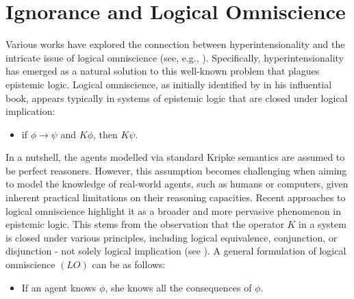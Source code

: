 \documentclass{article}
\begin{document}
\section{Ignorance and Logical Omniscience}
\label{SecOmniscience}

Various works have explored the connection between hyperintensionality and the intricate issue of logical omniscience (see, e.g., \citet{Fagin1995}). Specifically, hyperintensionality has emerged as a natural solution to this well-known problem that plagues epistemic logic. Logical omniscience, as initially identified by \citet{Hintikka1962} in his influential book, appears typically in systems of epistemic logic that are closed under logical implication:

\begin{itemize}

\item[$(LI)$] if $\phi \rightarrow \psi$ and $K \phi$, then $K \psi$.

\end{itemize}

In a nutshell, the agents modelled via standard Kripke semantics are assumed to be perfect reasoners. However, this assumption becomes challenging when aiming to model the knowledge of real-world agents, such as humans or computers, given inherent practical limitations on their reasoning capacities. Recent approaches to logical omniscience highlight it as a broader and more pervasive phenomenon in epistemic logic. This stems from the observation that the operator $K$ in a system is closed under various principles, including logical equivalence, conjunction, or disjunction - not solely logical implication (see \citet{Fagin1995}). A general formulation of logical omniscience $(LO)$ can be as follows:

\begin{itemize}

\item[$(LO_{K})$] If an agent knows $\phi$, she knows all the consequences of $\phi$.

\end{itemize}
\end{document}
